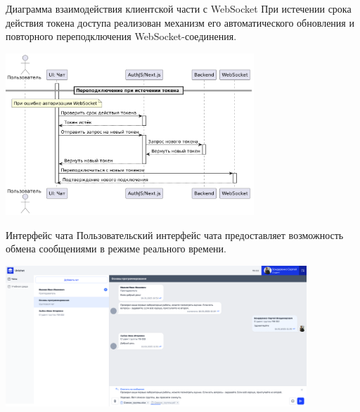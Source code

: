 \documentclass[aspectratio=169]{beamer}
\begin{document}
\begin{frame}{Диаграмма взаимодействия клиентской части с WebSocket}
\small
\justifying
При истечении срока действия токена доступа реализован механизм его автоматического обновления и повторного переподключения WebSocket-соединения.

\vspace{0.5em}

\centering
\includegraphics[width=0.7\textwidth]{static/WsReconnectSequence.png}
\end{frame}

\begin{frame}{Интерфейс чата}
\small
\justifying
Пользовательский интерфейс чата предоставляет возможность обмена сообщениями в режиме реального времени.

\vspace{1em}

\centering
\includegraphics[width=0.85\textwidth]{static/ChatsStudentPage.png}
\end{frame}

%
%
\end{document}
